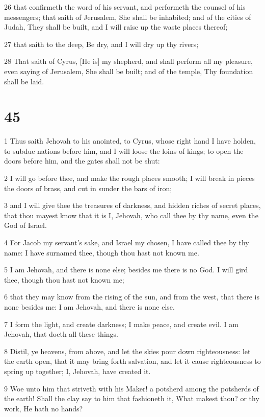 \par 26 that confirmeth the word of his servant, and performeth the counsel of his messengers; that saith of Jerusalem, She shall be inhabited; and of the cities of Judah, They shall be built, and I will raise up the waste places thereof;
\par 27 that saith to the deep, Be dry, and I will dry up thy rivers;
\par 28 That saith of Cyrus, [He is] my shepherd, and shall perform all my pleasure, even saying of Jerusalem, She shall be built; and of the temple, Thy foundation shall be laid.

\chapter{45}

\par 1 Thus saith Jehovah to his anointed, to Cyrus, whose right hand I have holden, to subdue nations before him, and I will loose the loins of kings; to open the doors before him, and the gates shall not be shut:
\par 2 I will go before thee, and make the rough places smooth; I will break in pieces the doors of brass, and cut in sunder the bars of iron;
\par 3 and I will give thee the treasures of darkness, and hidden riches of secret places, that thou mayest know that it is I, Jehovah, who call thee by thy name, even the God of Israel.
\par 4 For Jacob my servant's sake, and Israel my chosen, I have called thee by thy name: I have surnamed thee, though thou hast not known me.
\par 5 I am Jehovah, and there is none else; besides me there is no God. I will gird thee, though thou hast not known me;
\par 6 that they may know from the rising of the sun, and from the west, that there is none besides me: I am Jehovah, and there is none else.
\par 7 I form the light, and create darkness; I make peace, and create evil. I am Jehovah, that doeth all these things.
\par 8 Distil, ye heavens, from above, and let the skies pour down righteousness: let the earth open, that it may bring forth salvation, and let it cause righteousness to spring up together; I, Jehovah, have created it.
\par 9 Woe unto him that striveth with his Maker! a potsherd among the potsherds of the earth! Shall the clay say to him that fashioneth it, What makest thou? or thy work, He hath no hands?
